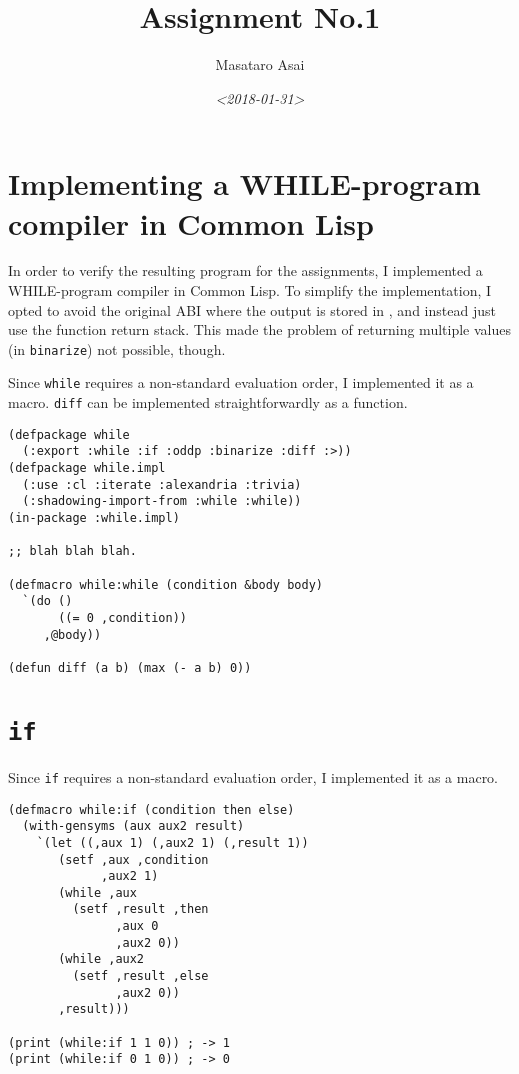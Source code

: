 \documentclass{article}
\author{Masataro Asai}
\date{\textit{<2018-01-31>} }
\title{Assignment No.1}
\begin{document}
\maketitle

\section{Implementing a WHILE-program compiler in Common Lisp}
\label{sec:orgbfa9313}

In order to verify the resulting program for the assignments, I implemented a
WHILE-program compiler in Common Lisp.  To simplify the implementation, I opted
to avoid the original ABI where the output is stored in , and instead just
use the function return stack. This made the problem of returning multiple
values (in \texttt{binarize}) not possible, though.

Since \texttt{while} requires a non-standard evaluation order, I implemented it as a macro.
\texttt{diff} can be implemented straightforwardly as a function.

\lstset{language=Lisp,label= ,caption= ,captionpos=b,numbers=none}
\begin{lstlisting}
(defpackage while
  (:export :while :if :oddp :binarize :diff :>))
(defpackage while.impl
  (:use :cl :iterate :alexandria :trivia)
  (:shadowing-import-from :while :while))
(in-package :while.impl)

;; blah blah blah.

(defmacro while:while (condition &body body)
  `(do ()
       ((= 0 ,condition))
     ,@body))

(defun diff (a b) (max (- a b) 0))
\end{lstlisting}

\section{\texttt{if}}
\label{sec:orgdd60bb7}

Since \texttt{if} requires a non-standard evaluation order, I implemented it as a macro.

\lstset{language=Lisp,label= ,caption= ,captionpos=b,numbers=none}
\begin{lstlisting}
(defmacro while:if (condition then else)
  (with-gensyms (aux aux2 result)
    `(let ((,aux 1) (,aux2 1) (,result 1))
       (setf ,aux ,condition
             ,aux2 1)
       (while ,aux
         (setf ,result ,then
               ,aux 0
               ,aux2 0))
       (while ,aux2
         (setf ,result ,else
               ,aux2 0))
       ,result)))

(print (while:if 1 1 0)) ; -> 1
(print (while:if 0 1 0)) ; -> 0
\end{lstlisting}
\end{document}
